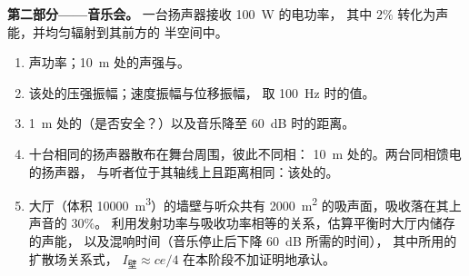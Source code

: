 \begin{problem}
\medskip
\noindent\textbf{第二部分——音乐会。}
一台扬声器接收 \qty{100}{W} 的电功率，
其中 $2\%$ 转化为声能，并均匀辐射到其前方的
半空间中。
\begin{enumerate}[resume]
  \item 声功率；\qty{10}{m} 处的声强与。
  \item 该处的压强振幅；速度振幅与位移振幅，
        取 \qty{100}{Hz} 时的值。
  \item \qty{1}{m} 处的（是否安全？）以及音乐降至
        \qty{60}{dB} 时的距离。
  \item 十台相同的扬声器散布在舞台周围，彼此不同相：
        \qty{10}{m} 处的。两台同相馈电的扬声器，
        与听者位于其轴线上且距离相同：该处的。
  \item 大厅（体积 \qty{10000}{m^3}）的墙壁与听众共有 \qty{2000}{m^2} 的吸声面，吸收落在其上声音的 $30\%$。
        利用发射功率与吸收功率相等的关系，估算平衡时大厅内储存的声能，
        以及混响时间（音乐停止后下降 \qty{60}{dB} 所需的时间），
        其中所用的
        扩散场关系式，
        $I_{\text{壁}} \approx ce/4$ 在本阶段不加证明地承认。
\end{enumerate}


\end{problem}
